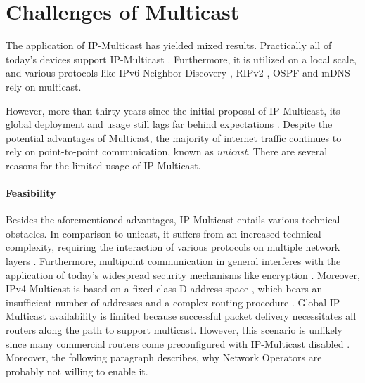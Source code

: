 \section{Challenges of Multicast} %
\label{sec:Challenges of Multicast}


The application of IP-Multicast has yielded mixed results.
Practically all of today's devices support IP-Multicast
    \cite{ratnasamy2006revisiting}.
Furthermore, it is utilized on a local scale, and various protocols like IPv6
    Neighbor Discovery \cite{rfc4861_ipv6_nd}, RIPv2 \cite{rfc2453_rip}, OSPF
    \cite{rfc2328_ospf} and mDNS \cite{rfc6762_mdns} rely on multicast.

However, more than thirty years since the initial proposal of IP-Multicast, its
    global deployment and usage still lags far behind expectations
    \cite{diot2000deployment, ratnasamy2006revisiting}.
Despite the potential advantages of Multicast, the majority of internet traffic
    continues to rely on point-to-point communication, known as
    \textit{unicast}.
There are several reasons for the limited usage of IP-Multicast.

\paragraph{Feasibility} %
\label{par:Feasibility}
Besides the aforementioned advantages, IP-Multicast entails various technical
    obstacles.
In comparison to unicast, it suffers from an increased technical complexity,
    requiring the interaction of various protocols on multiple network layers
    \cite{ratnasamy2006revisiting,diot2000deployment}.
Furthermore, multipoint communication in general interferes with the
    application of today's widespread security mechanisms like encryption
    \cite{rafaeli2003group_key_mgm}.
Moreover, IPv4-Multicast is based on a fixed class D address space
    \cite{rfc1112_ipmc}, which bears an insufficient number of addresses
    \cite{meadcast2} and a complex routing procedure
    \cite{diot2000deployment,ratnasamy2006revisiting}.
Global IP-Multicast availability is limited because successful packet delivery
    necessitates all routers along the path to support multicast.
However, this scenario is unlikely since many commercial routers come
    preconfigured with IP-Multicast disabled \cite{aruba_doc}.
Moreover, the following paragraph describes, why Network Operators are probably
    not willing to enable it.

